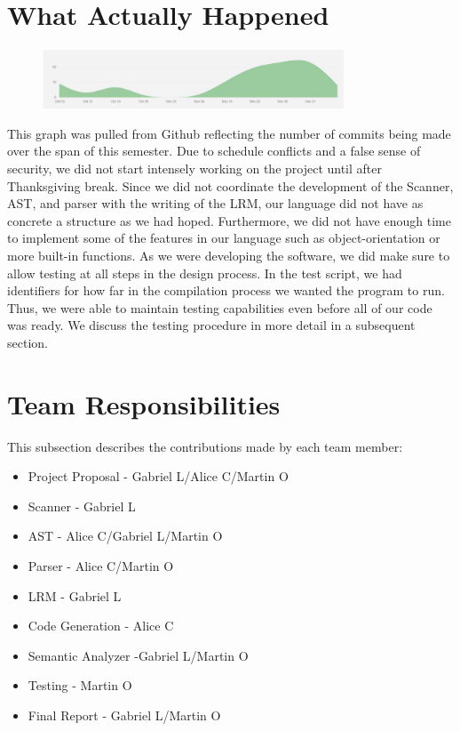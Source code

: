 \documentclass[11pt]{report}
\begin{document}
\section{What Actually Happened}
\begin{figure}[h]
 \centering
 \includegraphics[width=0.8\textwidth]{Github_Graph}
\end{figure}
This graph was pulled from Github reflecting the number of commits being made over the span of this semester. Due to schedule conflicts and a false sense of security, we did not start intensely working on the project until after Thanksgiving break. Since we did not coordinate the development of the Scanner, AST, and parser with the writing of the LRM, our language did not have as concrete a structure as we had hoped. Furthermore, we did not have enough time to implement some of the features in our language such as object-orientation or more built-in functions. As we were developing the software, we did make sure to allow testing at all steps in the design process. In the test script, we had identifiers for how far in the compilation process we wanted the program to run. Thus, we were able to maintain testing capabilities even before all of our code was ready. We discuss the testing procedure in more detail in a subsequent section. 
\section{Team Responsibilities}
This subsection describes the contributions made by each team member:
\begin{itemize}
\item Project Proposal - Gabriel L/Alice C/Martin O
\item Scanner - Gabriel L
\item AST - Alice C/Gabriel L/Martin O
\item Parser - Alice C/Martin O
\item LRM - Gabriel L
\item Code Generation - Alice C
\item Semantic Analyzer -Gabriel L/Martin O
\item Testing - Martin O 
\item Final Report - Gabriel L/Martin O
\end{itemize}
\end{document}
